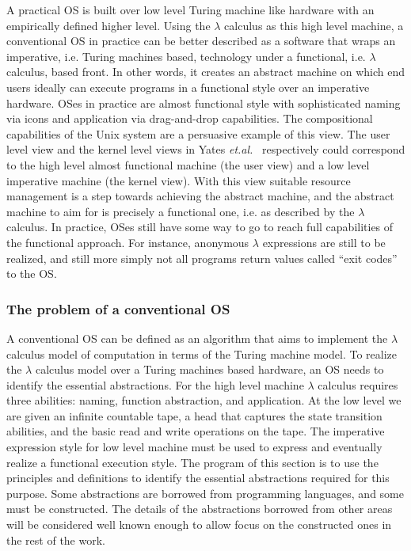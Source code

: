 \documentclass[draft]{article}
\def\etal{{\it et.al.}\ }
\begin{document}
A practical  OS is built over  low level Turing  machine like hardware
with  an  empirically  defined  higher  level.   Using  the  $\lambda$
calculus as this high level machine, a conventional OS in practice can
be  better described  as a  software  that wraps  an imperative,  i.e.
Turing machines based, technology  under a functional, i.e.  $\lambda$
calculus, based front.  In other words, it creates an abstract machine
on which end users ideally  can execute programs in a functional style
over an  imperative hardware.  OSes in practice  are almost functional
style  with  sophisticated  naming   via  icons  and  application  via
drag-and-drop  capabilities.  The  compositional  capabilities of  the
Unix system  are a  persuasive example of  this view.  The  user level
view    and    the    kernel    level    views    in    Yates    \etal
\cite{Yates99i/oautomaton} respectively  could correspond to  the high
level  almost functional  machine  (the  user view)  and  a low  level
imperative  machine  (the  kernel  view).   With  this  view  suitable
resource management is a  step towards achieving the abstract machine,
and the  abstract machine  to aim for  is precisely a  functional one,
i.e.  as described by the $\lambda$ calculus.  In practice, OSes still
have  some way  to go  to reach  full capabilities  of  the functional
approach.  For instance, anonymous  $\lambda$ expressions are still to
be  realized, and  still more  simply not  all programs  return values
called ``exit codes'' to the OS.

\subsubsection{The problem of a conventional OS}
\label{sec:usual:os:prob}
\label{sec:os:abstractions}

A  conventional  OS  can be  defined  as  an  algorithm that  aims  to
implement the $\lambda$ calculus model  of computation in terms of the
Turing machine model.  To realize  the $\lambda$ calculus model over a
Turing machines based hardware, an  OS needs to identify the essential
abstractions.  For the high  level machine $\lambda$ calculus requires
three  abilities: naming, function  abstraction, and  application.  At
the low  level we are  given an infinite  countable tape, a  head that
captures the state transition abilities,  and the basic read and write
operations on the tape.  The imperative expression style for low level
machine must  be used to  express and eventually realize  a functional
execution style.  The program of this section is to use the principles
and definitions  to identify  the essential abstractions  required for
this  purpose.   Some   abstractions  are  borrowed  from  programming
languages,  and  some  must   be  constructed.   The  details  of  the
abstractions borrowed  from other areas will be  considered well known
enough to allow focus on the constructed ones in the rest of the work.
\end{document}
